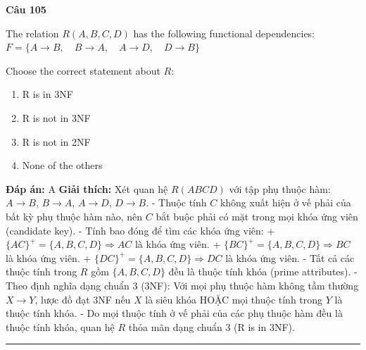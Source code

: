 \documentclass[11pt,a4paper]{article}
\newenvironment{question}[1]{%
  \par\vspace{1em}\noindent\textbf{\large Câu #1}\par\vspace{0.4em}
}{%
  \par\vspace{1em}\hrule\vspace{0.6em}
}
\newenvironment{choices}{%
  \begin{enumerate}[label=\textbf{\Alph*.},leftmargin=2.2em,itemsep=2pt,topsep=3pt]
}{%
  \end{enumerate}
}
\newcommand{\choice}{\item}
\begin{document}
\begin{question}{105}
The relation \(R(A, B, C, D)\) has the following functional dependencies:
\(F = \{ A \rightarrow B, \quad B \rightarrow A, \quad A \rightarrow D, \quad D \rightarrow B \}\)

Choose the correct statement about \(R\):
\begin{choices}
\choice R is in 3NF
\choice R is not in 3NF
\choice R is not in 2NF
\choice None of the others
\end{choices}
\textbf{Đáp án:} A
\textbf{Giải thích:} Xét quan hệ $R(ABCD)$ với tập phụ thuộc hàm: $A \rightarrow B$, $B \rightarrow A$, $A \rightarrow D$, $D \rightarrow B$.
- Thuộc tính $C$ không xuất hiện ở vế phải của bất kỳ phụ thuộc hàm nào, nên $C$ bắt buộc phải có mặt trong mọi khóa ứng viên (candidate key).
- Tính bao đóng để tìm các khóa ứng viên:
  + $\{AC\}^+ = \{A, B, C, D\} \Rightarrow AC$ là khóa ứng viên.
  + $\{BC\}^+ = \{A, B, C, D\} \Rightarrow BC$ là khóa ứng viên.
  + $\{DC\}^+ = \{A, B, C, D\} \Rightarrow DC$ là khóa ứng viên.
- Tất cả các thuộc tính trong $R$ gồm $\{A, B, C, D\}$ đều là thuộc tính khóa (prime attributes).
- Theo định nghĩa dạng chuẩn 3 (3NF): Với mọi phụ thuộc hàm không tầm thường $X \rightarrow Y$, lược đồ đạt 3NF nếu $X$ là siêu khóa HOẶC mọi thuộc tính trong $Y$ là thuộc tính khóa.
- Do mọi thuộc tính ở vế phải của các phụ thuộc hàm đều là thuộc tính khóa, quan hệ $R$ thỏa mãn dạng chuẩn 3 (R is in 3NF).
\end{question}
\end{document}
